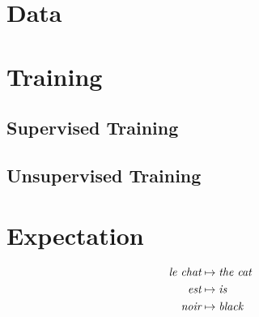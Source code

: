 \documentclass[twoside,twocolumn]{article}
\begin{document}
\section{Data}

\section{Training}

\subsection{Supervised Training}

\subsection{Unsupervised Training}

\section{Expectation}


\begin{equation}
\centering
\begin{split}
\textit{le chat} &\mapsto \textit{the cat} \\
\textit{est} &\mapsto \textit{is} \\
\textit{noir} &\mapsto \textit{black} \\
\end{split}
\end{equation}



\end{document}
